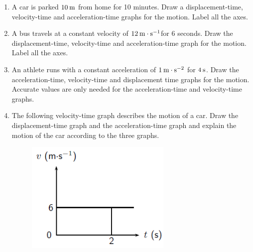           \label{m38795*id72955}\begin{enumerate}[noitemsep, label=\textbf{\arabic*}. ] 
            \label{m38795*uid116}\item A car is parked \begin{math}10\phantom{\rule{2pt}{0ex}}\mathrm{m}\end{math} from home for 10 minutes. Draw a displacement-time, velocity-time and acceleration-time graphs for the motion. Label all the axes.\newline
            
\label{m38795*uid117}\item A bus travels at a constant velocity of \begin{math}12\phantom{\rule{2pt}{0ex}}\mathrm{m}\ensuremath{\cdot}\mathrm{s}{}^{-1}\end{math}for 6 seconds. Draw the displacement-time, velocity-time and acceleration-time graph for the motion. Label all the axes.\newline
            
\label{m38795*uid118}\item An athlete runs with a constant acceleration of \begin{math}1\phantom{\rule{2pt}{0ex}}\mathrm{m}\ensuremath{\cdot}\mathrm{s}{}^{-2}\end{math} for \begin{math}4\phantom{\rule{2pt}{0ex}}\mathrm{s}\end{math}. Draw the acceleration-time, velocity-time and displacement time graphs for the motion. Accurate values are only needed for the acceleration-time and velocity-time graphs.\newline
            
\label{m38795*uid119}\item The following velocity-time graph describes the motion of a car. Draw the displacement-time graph and the acceleration-time graph and explain the motion of the car according to the three graphs.

    \setcounter{subfigure}{0}


	\begin{figure}[H] %
    \begin{center}
    \label{m38795*id73065!!!underscore!!!media}\label{m38795*id73065!!!underscore!!!printimage}\includegraphics[width=7cm]{col11305.imgs/m38795_PG10C2_027.png} %
        

\end{center}
\end{figure}
\end{enumerate}
